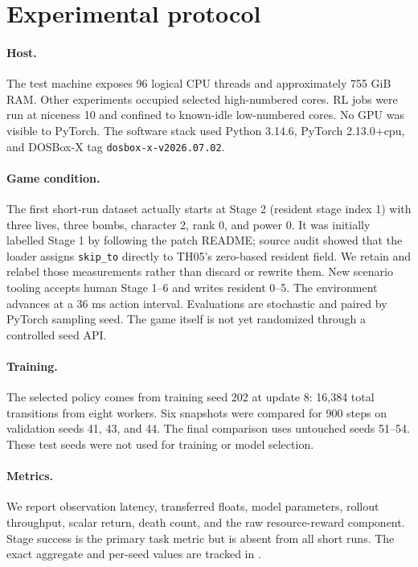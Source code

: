 \documentclass[10pt]{article}
\begin{document}
\section{Experimental protocol}

\paragraph{Host.}
The test machine exposes 96 logical CPU threads and approximately 755 GiB RAM.
Other experiments occupied selected high-numbered cores.  RL jobs were run at
niceness 10 and confined to known-idle low-numbered cores.  No GPU was visible
to PyTorch.  The software stack used Python 3.14.6, PyTorch 2.13.0+cpu, and
DOSBox-X tag \texttt{dosbox-x-v2026.07.02}.

\paragraph{Game condition.}
The first short-run dataset actually starts at Stage 2 (resident stage index 1)
with three lives, three bombs, character 2, rank 0, and power 0.  It was
initially labelled Stage 1 by following the patch README; source audit showed
that the loader assigns \texttt{skip\_to} directly to TH05's zero-based resident
field.  We retain and relabel those measurements rather than discard or rewrite
them.  New scenario tooling accepts human Stage 1--6 and writes resident 0--5.
The environment advances at a 36 ms action interval.  Evaluations are stochastic
and paired by PyTorch sampling seed.  The game itself is not yet randomized
through a controlled seed API.

\paragraph{Training.}
The selected policy comes from training seed 202 at update 8: 16,384 total
transitions from eight workers.  Six snapshots were compared for 900 steps on
validation seeds 41, 43, and 44.  The final comparison uses untouched seeds
51--54.  These test seeds were not used for training or model selection.

\paragraph{Metrics.}
We report observation latency, transferred floats, model parameters, rollout
throughput, scalar return, death count, and the raw resource-reward component.
Stage success is the primary task metric but is absent from all short runs.
The exact aggregate and per-seed values are tracked in
.
\end{document}
